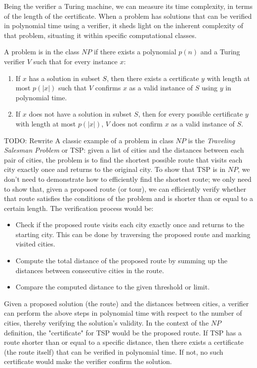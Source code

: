 Being the verifier a Turing machine, we can measure its time complexity, in terms of the length of the certificate. When a problem has solutions that can be verified in polynomial time using a verifier, it sheds light on the inherent complexity of that problem, situating it within specific computational classes.

\begin{definition}
A problem is in the class $NP$ if there exists a polynomial $p(n)$ and a Turing verifier $V$ such that for every instance $x$:
\begin{enumerate}
    \item If $x$ has a solution in subset $S$, then there exists a certificate $y$ with length at most $p(|x|)$ such that $V$ confirms $x$ as a valid instance of $S$ using $y$ in polynomial time.
    \item If $x$ does not have a solution in subset $S$, then for every possible certificate $y$ with length at most $p(|x|)$, $V$ does not confirm $x$ as a valid instance of $S$.
\end{enumerate}
\end{definition}

\begin{example}
{\color{red} TODO: Rewrite}
A classic example of a problem in class $NP$ is the \emph{Traveling Salesman Problem} or TSP: given a list of cities and the distances between each pair of cities, the problem is to find the shortest possible route that visits each city exactly once and returns to the original city. To show that TSP is in $NP$, we don't need to demonstrate how to efficiently find the shortest route; we only need to show that, given a proposed route (or tour), we can efficiently verify whether that route satisfies the conditions of the problem and is shorter than or equal to a certain length. The verification process would be:
\begin{itemize}
\item Check if the proposed route visits each city exactly once and returns to the starting city. This can be done by traversing the proposed route and marking visited cities.
\item Compute the total distance of the proposed route by summing up the distances between consecutive cities in the route. 
\item Compare the computed distance to the given threshold or limit.
\end{itemize}
Given a proposed solution (the route) and the distances between cities, a verifier can perform the above steps in polynomial time with respect to the number of cities, thereby verifying the solution's validity. In the context of the $NP$ definition, the "certificate" for TSP would be the proposed route. If TSP has a route shorter than or equal to a specific distance, then there exists a certificate (the route itself) that can be verified in polynomial time. If not, no such certificate would make the verifier confirm the solution.
\end{example}

